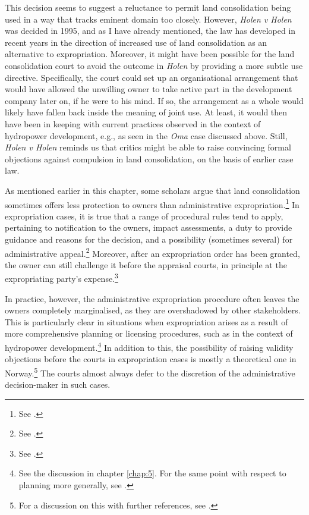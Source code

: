 This decision seems to suggest a reluctance to permit land consolidation being used in a way that tracks eminent domain too closely. However, {\it Holen v Holen} was decided in 1995, and as I have already mentioned, the law has developed in recent years in the direction of increased use of land consolidation as an alternative to expropriation. Moreover, it might have been possible for the land consolidation court to avoid the outcome in {\it Holen} by providing a more subtle use directive. Specifically, the court could set up an organisational arrangement that would have allowed the unwilling owner to take active part in the development company later on, if he were to his mind. If so, the arrangement as a whole would likely have fallen back inside the meaning of joint use. At least, it would then have been in keeping with current practices observed in the context of hydropower development, e.g., as seen in the {\it Oma} case discussed above. Still, {\it Holen v Holen} reminds us that critics might be able to raise convincing formal objections against compulsion in land consolidation, on the basis of earlier case law.

As mentioned earlier in this chapter, some scholars argue that land consolidation sometimes offers less protection to owners than administrative expropriation.\footnote{See \cite[318-319]{stenseth07}.} In expropriation cases, it is true that a range of procedural rules tend to apply, pertaining to notification to the owners, impact assessments, a duty to provide guidance and reasons for the decision, and a possibility (sometimes several) for administrative appeal.\footnote{See \cite[377-382]{dyrkolbotn15b}.} Moreover, after an expropriation order has been granted, the owner can still challenge it before the appraisal courts, in principle at the expropriating party's expense.\footnote{See \cite[382-384]{dyrkolbotn15b}.}

In practice, however, the administrative expropriation procedure often leaves the owners completely marginalised, as they are overshadowed by other stakeholders. This is particularly clear in situations when expropriation arises as a result of more comprehensive planning or licensing procedures, such as in the context of hydropower development.\footnote{See the discussion in chapter \ref{chap:5}. For the same point with respect to planning more generally, see \cite[376]{dyrkolbotn15b}.} In addition to this, the possibility of raising validity objections before the courts in expropriation cases is mostly a theoretical one in Norway.\footnote{For a discussion on this with further references, see \cite[384-386]{dyrkolbotn15b}.} The courts almost always defer to the discretion of the administrative decision-maker in such cases.

